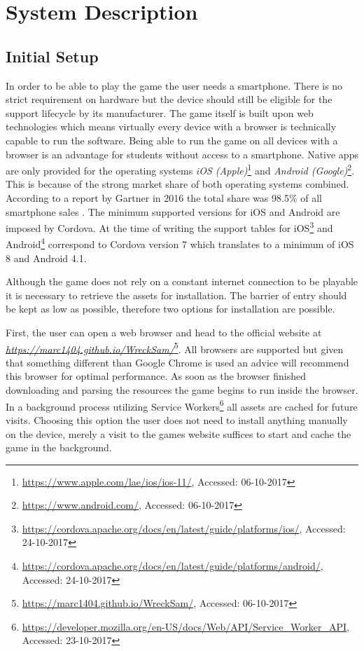 \clearpage

\section{System Description}

\subsection{Initial Setup} \label{initial-setup}
In order to be able to play the game the user needs a smartphone. There is no strict requirement on hardware but the device should still be eligible for the support lifecycle by its manufacturer. The game itself is built upon web technologies which means virtually every device with a browser is technically capable to run the software. Being able to run the game on all devices with a browser is an advantage for students without access to a smartphone. Native apps are only provided for the operating systems \textit{iOS (Apple)}\footnote{\url{https://www.apple.com/lae/ios/ios-11/}, Accessed: 06-10-2017} and \textit{Android (Google)}\footnote{\url{https://www.android.com/}, Accessed: 06-10-2017}. This is because of the strong market share of both operating systems combined. According to a report by Gartner in 2016 the total share was 98.5\% of all smartphone sales \cite{Goasduff2017Gartner2016}. The minimum supported versions for iOS and Android are imposed by Cordova. At the time of writing the support tables for iOS\footnote{\url{https://cordova.apache.org/docs/en/latest/guide/platforms/ios/}, Accessed: 24-10-2017} and Android\footnote{\url{https://cordova.apache.org/docs/en/latest/guide/platforms/android/}, Accessed: 24-10-2017} correspond to Cordova version 7 which translates to a minimum of iOS 8 and Android 4.1. 

Although the game does not rely on a constant internet connection to be playable it is necessary to retrieve the assets for installation. The barrier of entry should be kept as low as possible, therefore two options for installation are possible.

First, the user can open a web browser and head to the official website at \textit{\url{https://marc1404.github.io/WreckSam/}}\footnote{\url{https://marc1404.github.io/WreckSam/}, Accessed: 06-10-2017}. All browsers are supported but given that something different than Google Chrome is used an advice will recommend this browser for optimal performance. As soon as the browser finished downloading and parsing the resources the game begins to run inside the browser. In a background process utilizing Service Workers\footnote{\url{https://developer.mozilla.org/en-US/docs/Web/API/Service_Worker_API}, Accessed: 23-10-2017} all assets are cached for future visits. Choosing this option the user does not need to install anything manually on the device, merely a visit to the games website suffices to start and cache the game in the background.


